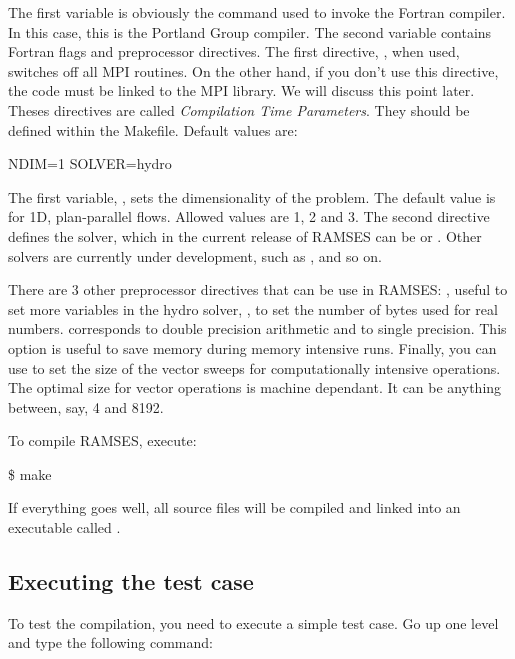 The first variable is obviously the command used to invoke the Fortran
compiler. In this case, this is the Portland Group compiler. The second
variable contains Fortran flags and preprocessor directives. The first
directive, , when used, switches off all MPI
routines. On the other hand, if you don't use this directive, the code
must be linked to the MPI library. We will discuss this point later.
Theses directives are called \emph{Compilation Time Parameters}.  They
should be defined within the Makefile. Default values are:

\begin{Prompt}
NDIM=1
SOLVER=hydro
\end{Prompt}

The first variable, , sets the dimensionality of the
problem. The default value is for 1D, plan-parallel flows. Allowed
values are 1, 2 and 3. The second directive defines the solver, which in
the current release of RAMSES can be  or .
Other solvers are currently under development, such as ,
 and so on.

There are 3 other preprocessor directives that can be use in RAMSES:
, useful to set more variables in the
hydro solver, , to set the number of bytes used
for real numbers.  corresponds to double precision
arithmetic and  to single precision. This option is useful
to save memory during memory intensive runs. Finally, you can use
 to set the size of the vector sweeps for
computationally intensive operations. The optimal size for vector operations
is machine dependant. It can be anything between, say, 4 and 8192.

To compile RAMSES, execute:

\begin{Prompt}
\$ make
\end{Prompt}

If everything goes well, all source files will be compiled and linked
into an executable called .

\subsection{Executing the test case}

To test the compilation, you need to execute a simple test case. Go up
one level and type the following command:

